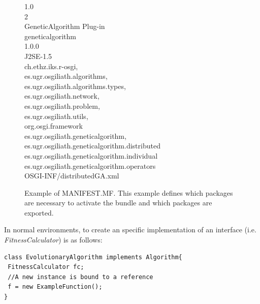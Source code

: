 \documentclass{sig-alternate}
\begin{document}
\begin{figure}[t]
\noindent
\ttfamily
{} 1.0\\
 2\\
 GeneticAlgorithm Plug-in\\
 geneticalgorithm\\
 1.0.0\\
 J2SE-1.5\\
 ch.ethz.iks.r-osgi,\\
 \hlstd{}es.ugr.osgiliath.algorithms,\\
 \hlstd{}es.ugr.osgiliath.algorithms.types,\\
 \hlstd{}es.ugr.osgiliath.network,\\
 \hlstd{}es.ugr.osgiliath.problem,\\
 \hlstd{}es.ugr.osgiliath.utils,\\
  \hlstd{}org.osgi.framework\\
 es.ugr.osgiliath.geneticalgorithm,\\
 \hlstd{}es.ugr.osgiliath.geneticalgorithm.distributed\\
  \hlstd{}es.ugr.osgiliath.geneticalgorithm.individual\\
   \hlstd{}es.ugr.osgiliath.geneticalgorithm.operators\\
\hlstd{} OSGI-INF/distributedGA.xml\\
\mbox{}
 
\normalfont
\label{fig:manifest}
\caption{Example of MANIFEST.MF. This example defines which packages are necessary to activate the bundle and which packages are exported.}
\end {figure}

In normal environments, to create an specific implementation of an interface (i.e. {\em FitnessCalculator}) is as follows:

\begin{lstlisting}
class EvolutionaryAlgorithm implements Algorithm{
 FitnessCalculator fc;
 //A new instance is bound to a reference
 f = new ExampleFunction();
}
\end{lstlisting}
 
\end{document}
